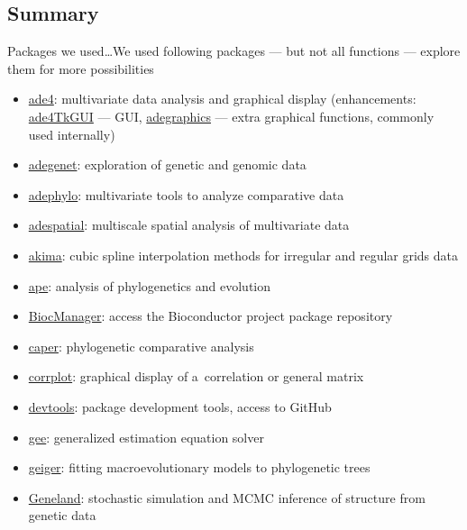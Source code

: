 \documentclass[compress, xelatex, 11pt, xcolor=svgnames, aspectratio=169,
	hyperref={
		bookmarks=true,
		unicode=true,
		colorlinks=true,
		pdftitle={Molecular data in R},
		plainpages=false,
		pdfauthor={Vojtech Zeisek},
		pdfsubject={Course about phylogeny and evolution in R},
		pdfcreator={XeLaTeX},
		pdfkeywords={R, evolution, phylogeny, molecular data},
		linkcolor=Crimson, %
		anchorcolor=Magenta, %
		citecolor=Magenta, %
		filecolor=Magenta, %
		menucolor=Magenta, %
		urlcolor=DodgerBlue, %
		},
	url={hyphens, lowtilde} %
	]{beamer}
\begin{document}
\subsection{Summary}

\begin{frame}[allowframebreaks]{Packages we used\ldots}{We used following packages --- but not all functions --- explore them for more possibilities}
	\begin{itemize}
		\item \href{https://CRAN.R-project.org/package=ade4}{ade4}: multivariate data analysis and graphical display (enhancements: \href{https://CRAN.R-project.org/package=ade4TkGUI}{ade4TkGUI} --- GUI, \href{https://CRAN.R-project.org/package=adegraphics}{adegraphics} --- extra graphical functions, commonly used internally)
		\item \href{https://CRAN.R-project.org/package=adegenet}{adegenet}: exploration of genetic and genomic data
		\item \href{https://CRAN.R-project.org/package=adephylo}{adephylo}: multivariate tools to analyze comparative data
		\item \href{https://CRAN.R-project.org/package=adespatial}{adespatial}: multiscale spatial analysis of multivariate data
		\item \href{https://CRAN.R-project.org/package=akima}{akima}: cubic spline interpolation methods for irregular and regular grids data
		\item \href{https://CRAN.R-project.org/package=ape}{ape}: analysis of phylogenetics and evolution
		\item \href{https://CRAN.R-project.org/package=BiocManager}{BiocManager}: access the Bioconductor project package repository
		\item \href{https://CRAN.R-project.org/package=caper}{caper}: phylogenetic comparative analysis
		\item \href{https://CRAN.R-project.org/package=corrplot}{corrplot}: graphical display of a~correlation or general matrix
		\item \href{https://CRAN.R-project.org/package=devtools}{devtools}: package development tools, access to GitHub
		\item \href{https://CRAN.R-project.org/package=gee}{gee}: generalized estimation equation solver
		\item \href{https://CRAN.R-project.org/package=geiger}{geiger}: fitting macroevolutionary models to phylogenetic trees
		\item \href{https://i-pri.org/special/Biostatistics/Software/Geneland/}{Geneland}: stochastic simulation and MCMC inference of structure from genetic data

\end{itemize}
\end{frame}
\end{document}
